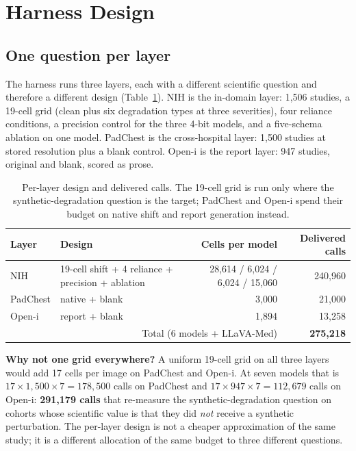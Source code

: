 \section{Harness Design}
\label{sec:design}

\subsection{One question per layer}

The harness runs three layers, each with a different scientific question and therefore a different design (Table~\ref{tab:layers}). NIH is the in-domain layer: 1,506 studies, a 19-cell grid (clean plus six degradation types at three severities), four reliance conditions, a precision control for the three 4-bit models, and a five-schema ablation on one model. PadChest is the cross-hospital layer: 1,500 studies at stored resolution plus a blank control. Open-i is the report layer: 947 studies, original and blank, scored as prose.

\begin{table}[t]
\centering
\small
\caption{Per-layer design and delivered calls. The 19-cell grid is run only where the synthetic-degradation question is the target; PadChest and Open-i spend their budget on native shift and report generation instead.}
\label{tab:layers}
\begin{tabular}{llrr}
\toprule
Layer & Design & Cells per model & Delivered calls \\
\midrule
NIH & 19-cell shift + 4 reliance + precision + ablation & 28,614 / 6,024 / 6,024 / 15,060 & 240,960 \\
PadChest & native + blank & 3,000 & 21,000 \\
Open-i & report + blank & 1,894 & 13,258 \\
\midrule
\multicolumn{3}{r}{Total (6 models + LLaVA-Med)} & \textbf{275,218} \\
\bottomrule
\end{tabular}
\end{table}

\textbf{Why not one grid everywhere?} A uniform 19-cell grid on all three layers would add 17 cells per image on PadChest and Open-i. At seven models that is $17\times1{,}500\times7=178{,}500$ calls on PadChest and $17\times947\times7=112{,}679$ calls on Open-i: \textbf{291,179 calls} that re-measure the synthetic-degradation question on cohorts whose scientific value is that they did \emph{not} receive a synthetic perturbation. The per-layer design is not a cheaper approximation of the same study; it is a different allocation of the same budget to three different questions.

